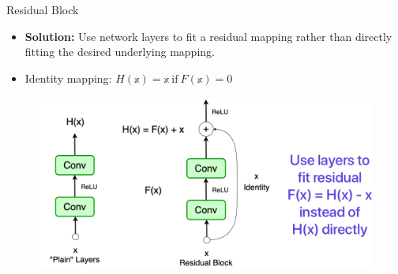 \documentclass[serif, aspectratio=169]{beamer}
\begin{document}
\begin{frame}{Residual Block}
	
	\begin{itemize}
		\item \textbf{Solution:} Use network layers to fit a residual mapping rather than directly fitting the desired underlying mapping.
		\item Identity mapping: $H(\mathbb{x}) = \mathbb{x} \  \text{if} \ F(\mathbb{x}) = 0$
	\end{itemize}
	
	\begin{figure}[htpb]
		\begin{center}
			\hspace{2cm} \includegraphics[keepaspectratio, scale=0.24]{pic/resBlock2}
		\end{center}
	\end{figure}

\end{frame}
\end{document}
